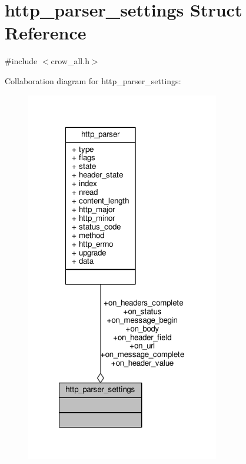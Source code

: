 \hypertarget{structhttp__parser__settings}{\section{http\-\_\-parser\-\_\-settings Struct Reference}
\label{structhttp__parser__settings}
}


{\ttfamily \#include $<$crow\-\_\-all.\-h$>$}



Collaboration diagram for http\-\_\-parser\-\_\-settings\-:
\nopagebreak
\begin{figure}[H]
\begin{center}
\leavevmode
\includegraphics[width=239pt]{structhttp__parser__settings__coll__graph}
\end{center}
\end{figure}
